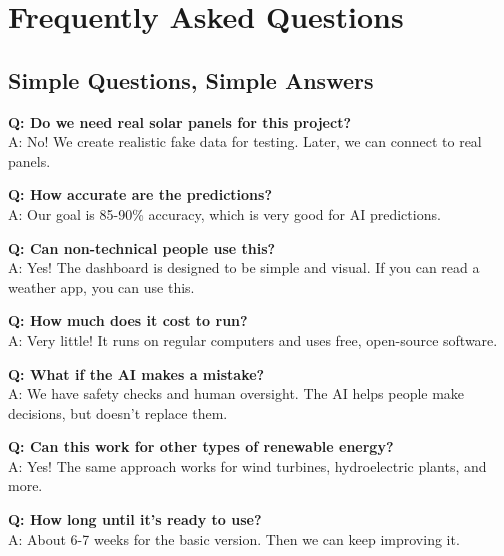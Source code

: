 \documentclass[12pt,a4paper]{article}
\begin{document}
\newpage

\section{Frequently Asked Questions}

\subsection{Simple Questions, Simple Answers}

\textbf{Q: Do we need real solar panels for this project?}\\
A: No! We create realistic fake data for testing. Later, we can connect to real panels.

\vspace{0.5cm}

\textbf{Q: How accurate are the predictions?}\\
A: Our goal is 85-90\% accuracy, which is very good for AI predictions.

\vspace{0.5cm}

\textbf{Q: Can non-technical people use this?}\\
A: Yes! The dashboard is designed to be simple and visual. If you can read a weather app, you can use this.

\vspace{0.5cm}

\textbf{Q: How much does it cost to run?}\\
A: Very little! It runs on regular computers and uses free, open-source software.

\vspace{0.5cm}

\textbf{Q: What if the AI makes a mistake?}\\
A: We have safety checks and human oversight. The AI helps people make decisions, but doesn't replace them.

\vspace{0.5cm}

\textbf{Q: Can this work for other types of renewable energy?}\\
A: Yes! The same approach works for wind turbines, hydroelectric plants, and more.

\vspace{0.5cm}

\textbf{Q: How long until it's ready to use?}\\
A: About 6-7 weeks for the basic version. Then we can keep improving it.
\end{document}
